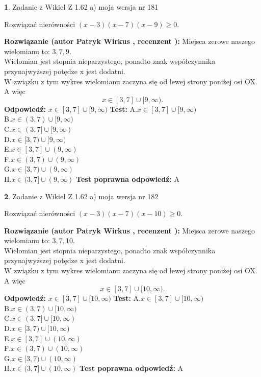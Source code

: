 \documentclass[12pt, a4paper]{article}
\theoremstyle{definition} %
\newtheorem{zad}{}
\newcommand{\zadStart}[1]{\begin{zad}#1\newline}
\newcommand{\zadStop}{\end{zad}}
\newcommand{\rozwStart}[2]{\noindent \textbf{Rozwiązanie (autor #1 , recenzent #2): }\newline}
\newcommand{\rozwStop}{\newline}
\newcommand{\odpStart}{\noindent \textbf{Odpowiedź:}\newline}
\newcommand{\odpStop}{\newline}
\newcommand{\testStart}{\noindent \textbf{Test:}\newline}
\newcommand{\testStop}{\newline}
\newcommand{\kluczStart}{\noindent \textbf{Test poprawna odpowiedź:}\newline}
\newcommand{\kluczStop}{\newline}
\begin{document}
\zadStart{Zadanie z Wikieł Z 1.62 a) moja wersja nr 181}

Rozwiązać nierówności $(x-3)(x-7)(x-9)\ge0$.
\zadStop
\rozwStart{Patryk Wirkus}{}
Miejsca zerowe naszego wielomianu to: $3, 7, 9$.\\
Wielomian jest stopnia nieparzystego, ponadto znak współczynnika przy\linebreak najwyższej potędze x jest dodatni.\\ W związku z tym wykres wielomianu zaczyna się od lewej strony poniżej osi OX. A więc $$x \in [3,7] \cup [9,\infty).$$
\rozwStop
\odpStart
$x \in [3,7] \cup [9,\infty)$
\odpStop
\testStart
A.$x \in [3,7] \cup [9,\infty)$\\
B.$x \in (3,7) \cup [9,\infty)$\\
C.$x \in (3,7] \cup [9,\infty)$\\
D.$x \in [3,7) \cup [9,\infty)$\\
E.$x \in [3,7] \cup (9,\infty)$\\
F.$x \in (3,7) \cup (9,\infty)$\\
G.$x \in [3,7) \cup (9,\infty)$\\
H.$x \in (3,7] \cup (9,\infty)$
\testStop
\kluczStart
A
\kluczStop



\zadStart{Zadanie z Wikieł Z 1.62 a) moja wersja nr 182}

Rozwiązać nierówności $(x-3)(x-7)(x-10)\ge0$.
\zadStop
\rozwStart{Patryk Wirkus}{}
Miejsca zerowe naszego wielomianu to: $3, 7, 10$.\\
Wielomian jest stopnia nieparzystego, ponadto znak współczynnika przy\linebreak najwyższej potędze x jest dodatni.\\ W związku z tym wykres wielomianu zaczyna się od lewej strony poniżej osi OX. A więc $$x \in [3,7] \cup [10,\infty).$$
\rozwStop
\odpStart
$x \in [3,7] \cup [10,\infty)$
\odpStop
\testStart
A.$x \in [3,7] \cup [10,\infty)$\\
B.$x \in (3,7) \cup [10,\infty)$\\
C.$x \in (3,7] \cup [10,\infty)$\\
D.$x \in [3,7) \cup [10,\infty)$\\
E.$x \in [3,7] \cup (10,\infty)$\\
F.$x \in (3,7) \cup (10,\infty)$\\
G.$x \in [3,7) \cup (10,\infty)$\\
H.$x \in (3,7] \cup (10,\infty)$
\testStop
\kluczStart
A
\kluczStop
\end{document}
